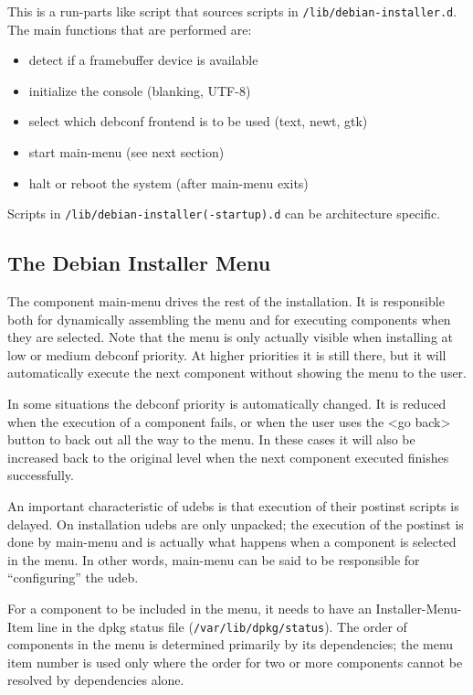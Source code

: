 \documentclass[a4paper,10pt]{article}
\begin{document}
\begin{enumerate}
\begin{flushleft}
This is a run-parts like script that sources scripts in \texttt{/lib/debian-installer.d}. The main functions that are performed are:
  \end{flushleft}
  \begin{itemize}
\item detect if a framebuffer device is available
\item initialize the console (blanking, UTF-8)
\item select which debconf frontend is to be used (text, newt, gtk)
\item start main-menu (see next section)
\item halt or reboot the system (after main-menu exits)
  \end{itemize}
\end{enumerate}

Scripts in \texttt{/lib/debian-installer(-startup).d} can be architecture specific. 


\subsection{The Debian Installer Menu}
The component main-menu drives the rest of the installation. It is responsible both for dynamically assembling the menu and for executing components when they are selected. Note that the menu is only actually visible when installing at low or medium debconf priority. At higher priorities it is still there, but it will automatically execute the next component without showing the menu to the user. 

In some situations the debconf priority is automatically changed. It is reduced when the execution of a component fails, or when the user uses the <go back> button to back out all the way to the menu. In these cases it will also be increased back to the original level when the next component executed finishes successfully. 

An important characteristic of udebs is that execution of their postinst scripts is delayed. On installation udebs are only unpacked; the execution of the postinst is done by main-menu and is actually what happens when a component is selected in the menu. In other words, main-menu can be said to be responsible for “configuring” the udeb. 

For a component to be included in the menu, it needs to have an Installer-Menu-Item line in the dpkg status file (\texttt{/var/lib/dpkg/status}). The order of components in the menu is determined primarily by its dependencies; the menu item number is used only where the order for two or more components cannot be resolved by dependencies alone. 
\end{document}
